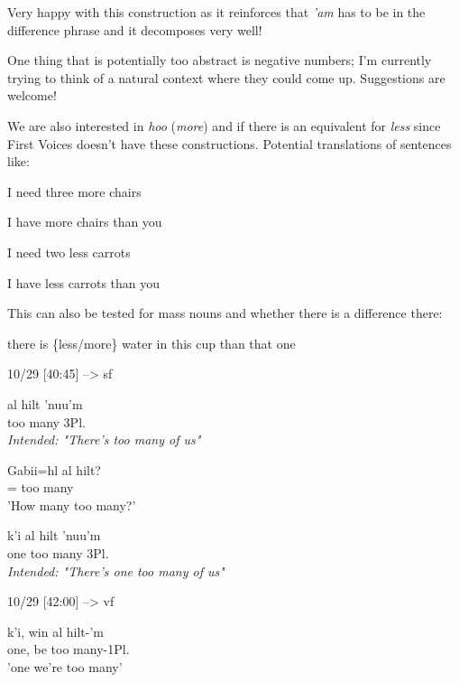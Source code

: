 \documentclass{article}
\begin{document}
Very happy with this construction as it reinforces that \textit{'am} has to be in the difference phrase and it decomposes very well!

One thing that is potentially too abstract is negative numbers; I'm currently trying to think of a natural context where they could come up. Suggestions are welcome!

We are also interested in \textit{hoo} (\textit{more}) and if there is an equivalent for \textit{less} since First Voices doesn't have these constructions.
Potential translations of sentences like:
\begin{exe}
\ex \begin{xlist}
\item I need three more chairs
\item I have more chairs than you
\item I need two less carrots
\item I have less carrots than you
\end{xlist}
\end{exe}
This can also be tested for mass nouns and whether there is a difference there:
\begin{exe}
\ex there is \{less/more\} water in this cup than that one
\end{exe}

10/29 [40:45] --> sf
\begin{exe}
\ex \begin{xlist}
\item \gll {}al hilt 'nuu'm\\
too many 3Pl.\Iii{}\\
\textit{Intended: "There's too many of us"}
\item \gll Gabii=hl al hilt?\\
\Mass{}=\Cn{} too many\\
'How many too many?'
\item \gll k'i al hilt 'nuu'm\\
one too many 3Pl.\Iii{}\\
\textit{Intended: "There's one too many of us"}
\end{xlist}
\end{exe}

10/29 [42:00] --> vf
\begin{exe}
\ex \gll k'i, win al hilt-'m\\
one, be too many-1Pl.\Iii{}\\
'one we're too many'
\end{exe}
\end{document}
